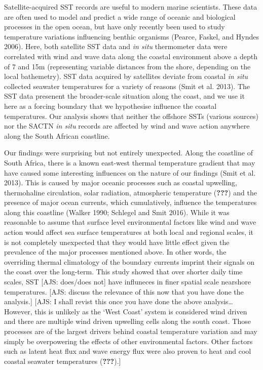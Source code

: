 \documentclass[12pt,a4paper,]{article}
\begin{document}
Satellite-acquired SST records are useful to modern marine scientists.
These data are often used to model and predict a wide range of oceanic
and biological processes in the open ocean, but have only recently been
used to study temperature variations influencing benthic organisms
(Pearce, Faskel, and Hyndes 2006). Here, both satellite SST data and
\emph{in situ} thermometer data were correlated with wind and wave data
along the coastal environment above a depth of 7 and 15m (representing
variable distances from the shore, depending on the local bathemetry).
SST data acquired by satellites deviate from coastal \emph{in situ}
collected seawater temperatures for a variety of reasons (Smit et al.
2013). The SST data presenent the broader-scale situation along the
coast, and we use it here as a forcing boundary that we hypothesise
influence the coastal temperatures. Our analysis shows that neither the
offshore SSTs (various sources) nor the SACTN \emph{in situ} records are
affected by wind and wave action anywhere along the South African
coastline.

Our findings were surprising but not entirely unexpected. Along the
coastline of South Africa, there is a known east-west thermal
temperature gradient that may have caused some interesting influences on
the nature of our findings (Smit et al. 2013). This is caused by major
oceanic processes such as coastal upwelling, thermohaline circulation,
solar radiation, atmospheric temperature ({\textbf{???}}) and the
presence of major ocean currents, which cumulatively, influence the
temperatures along this coastline (Walker 1990; Schlegel and Smit 2016).
While it was reasonable to assume that surface level environmental
factors like wind and wave action would affect sea surface temperatures
at both local and regional scales, it is not completely unexpected that
they would have little effect given the prevalence of the major
processes mentioned above. In other words, the overriding thermal
climatology of the boundary currents imprint their signals on the coast
over the long-term. This study showed that over shorter daily time
scales, SST {[}AJS: does/does not{]} have influneces in finer spatial
scale nearshore temperatures. {[}AJS: discuss the relevance of this now
that you have done the analysis.{]} {[}AJS: I shall revist this once you
have done the above analysis\ldots{}However, this is unlikely as the
`West Coast' system is considered wind driven and there are multiple
wind driven upwelling cells along the south coast. Those processes are
of the largest drivers behind coastal temperature variation and may
simply be overpowering the effects of other environmental factors. Other
factors such as latent heat flux and wave energy flux were also proven
to heat and cool coastal seawater temperatures ({\textbf{???}}).{]}
\end{document}
